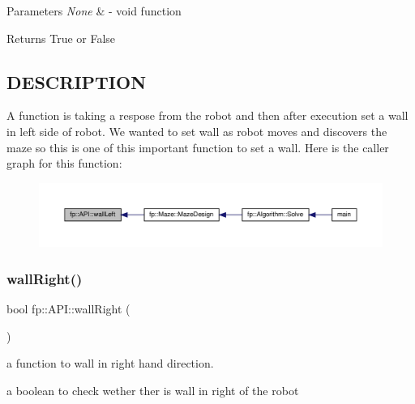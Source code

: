 \begin{DoxyParams}{Parameters}
{\em None} & -\/ void function \\
\hline
\end{DoxyParams}
\begin{DoxyReturn}{Returns}
True or False 
\end{DoxyReturn}
\hypertarget{_m_a_z_e_8h_DESCRIPTION}{}\subsection{D\+E\+S\+C\+R\+I\+P\+T\+I\+ON}\label{_m_a_z_e_8h_DESCRIPTION}
A function is taking a respose from the robot and then after execution set a wall in left side of robot. We wanted to set wall as robot moves and discovers the maze so this is one of this important function to set a wall. Here is the caller graph for this function\+:
\nopagebreak
\begin{figure}[H]
\begin{center}
\leavevmode
\includegraphics[width=350pt]{classfp_1_1_a_p_i_a49efec34a5521b6a7f202759f7f758d2_icgraph}
\end{center}
\end{figure}
\mbox{\label{classfp_1_1_a_p_i_aeaebbd3b022bc0ed768dc3112ea1db94}} 
\subsubsection{\texorpdfstring{wall\+Right()}{wallRight()}}
{\footnotesize\ttfamily bool fp\+::\+A\+P\+I\+::wall\+Right (\begin{DoxyParamCaption}{ }\end{DoxyParamCaption})\hspace{0.3cm}{\ttfamily [static]}}



a function to wall in right hand direction. 

a boolean to check wether ther is wall in right of the robot


